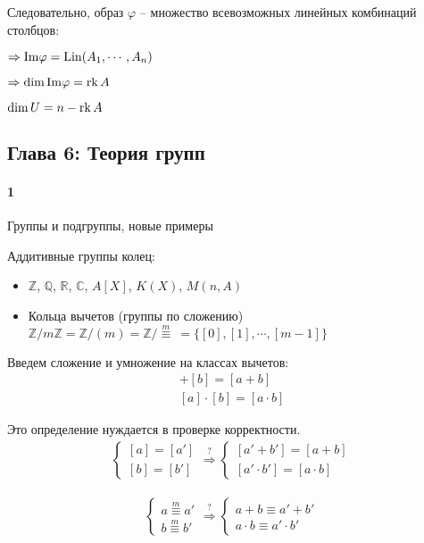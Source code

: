 Следовательно, образ $\varphi$ – множество всевозможных линейных комбинаций столбцов: 

$\Rightarrow \mathrm{{Im}{\varphi}} = \operatorname{Lin}(A_1, \cdots, A_n)$

$\Rightarrow \dim{\mathrm{{Im}{\varphi}}} =\operatorname{rk} A$

\follow 
$\dim{U} = n - \operatorname{rk} A$

\subsection{Глава 6: Теория групп}

\paragraph{1}{ Группы и подгруппы, новые примеры}

Аддитивные группы колец:

\begin{itemize}
\item $\mathbb{Z}$, $\mathbb{Q}$, $\mathbb{R}$, $\mathbb{C}$, $A[X]$, $K(X)$, $M(n, A)$
\item Кольца вычетов (группы по сложению) $\mathbb{Z}/m\mathbb{Z} = \mathbb{Z}/(m) = \mathbb{Z}/\stackrel{m}{\equiv}\ = \{ [0], [1], \cdots, [m-1] \}$
\end{itemize}

Введем сложение и умножение на классах вычетов: 
\begin{gather*}
  [a] + [b] = [a + b] \\
  [a]\cdot [b] = [a \cdot b]
\end{gather*}

Это определение нуждается в проверке корректности.
\begin{gather*}
\begin{cases}
    [a] = [a']  \\
    [b] = [b']
\end{cases}
\stackrel{?}{\Rightarrow}
\begin{cases}
  [a' + b'] = [a + b]  \\
  [a' \cdot b'] = [a \cdot b]
\end{cases}
\end{gather*}

\begin{gather*}
\begin{cases}
  a \stackrel{m}{\equiv} a' \\
  b \stackrel{m}{\equiv} b'
\end{cases}
\stackrel{?}{\Rightarrow}
\begin{cases}
  a + b \equiv a' + b' \\ 
  a \cdot b \equiv a' \cdot b'
\end{cases}
\end{gather*}

